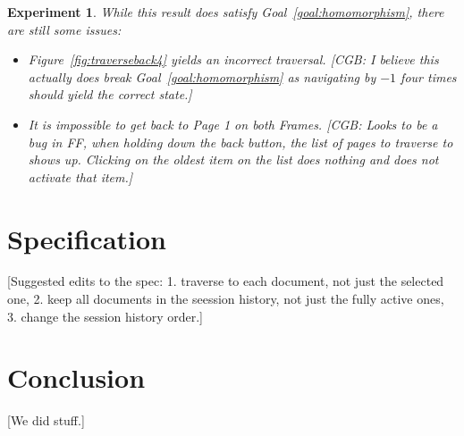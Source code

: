 \documentclass{article}
\newtheorem{experiment}{Experiment}
\begin{document}
\begin{experiment}
  While this result does satisfy Goal~\ref{goal:homomorphism}, there are still some issues:
  \begin{itemize}
    \item Figure~\ref{fig:traverseback4} yields an incorrect traversal. [CGB: I believe this actually does break Goal~\ref{goal:homomorphism} as navigating by $-1$ four times should yield the correct state.]
    \item It is impossible to get back to Page 1 on both Frames. [CGB: Looks to be a bug in FF, when holding down the back button, the list of pages to traverse to shows up. Clicking on the oldest item on the list does nothing and does not activate that item.]
  \end{itemize}

\end{experiment}

\section{Specification}

[Suggested edits to the spec:
  1. traverse to each document, not just the selected one,
  2. keep all documents in the seession history, not just the fully active ones,
  3. change the session history order.]

\section{Conclusion}

[We did stuff.]
\end{document}

